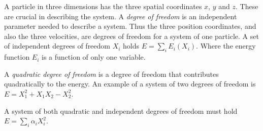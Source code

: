 \documentclass[11pt]{article}
\numberwithin{equation}{section}
\numberwithin{figure}{section}
\newcommand{\ita}[1]{\textit{#1}}
\begin{document}
A particle in three dimensions has the three spatial coordinates
$x$, $y$ and $z$. These are crucial in describing the system.
A \ita{degree of freedom} is an independent parameter needed to describe
a system. Thus the three position coordinates, and also 
the three velocities, are 
degrees of freedom for a system of one particle.
A set of independent degrees of freedom $X_i$ holds $E = \sum_i E_i(X_i)$.
Where the energy function $E_i$ is a function of only one variable.

A \ita{quadratic degree of freedom} is a degree of freedom that
contributes quadratically to the energy.
An example of a system of two degrees of freedom is
$E = X_1^2 + X_1 X_2 - X_2^2$.

A system of both quadratic and independent degrees of freedom must hold
$E = \sum_i \alpha_i X_i^2$.
\end{document}
